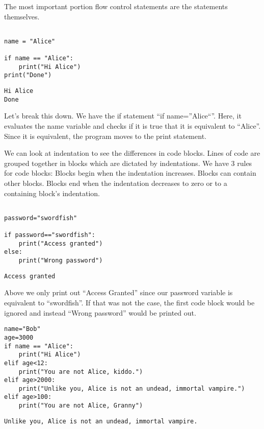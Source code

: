 \documentclass[11pt]{article}
\begin{document}
The most important portion flow control statements are the statements themselves.

\begin{verbatim}

name = "Alice"

if name == "Alice":
    print("Hi Alice")
print("Done")
\end{verbatim}

\begin{verbatim}
Hi Alice
Done
\end{verbatim}


Let's break this down. We have the if statement ``if name=''Alice``''. Here, it evaluates the name variable and checks if it is true that it is equivalent to ``Alice''. Since it is equivalent, the program moves to the print statement.

We can look at indentation to see the differences in code blocks. Lines of code are grouped together in blocks which are dictated by indentations. We have 3 rules for code blocks: Blocks begin when the indentation increases. Blocks can contain other blocks. Blocks end when the indentation decreases to zero or to a containing block’s indentation.

\begin{verbatim}

password="swordfish"

if password=="swordfish":
    print("Access granted")
else:
    print("Wrong password")

\end{verbatim}

\begin{verbatim}
Access granted
\end{verbatim}


Above we only print out ``Access Granted'' since our password variable is equivalent to ``swordfish''. If that was not the case, the first code block would be ignored and instead ``Wrong password'' would be printed out.


\begin{verbatim}
name="Bob"
age=3000
if name == "Alice":
    print("Hi Alice")
elif age<12:
    print("You are not Alice, kiddo.")
elif age>2000:
    print("Unlike you, Alice is not an undead, immortal vampire.")
elif age>100:
    print("You are not Alice, Granny")

\end{verbatim}

\begin{verbatim}
Unlike you, Alice is not an undead, immortal vampire.
\end{verbatim}
\end{document}
